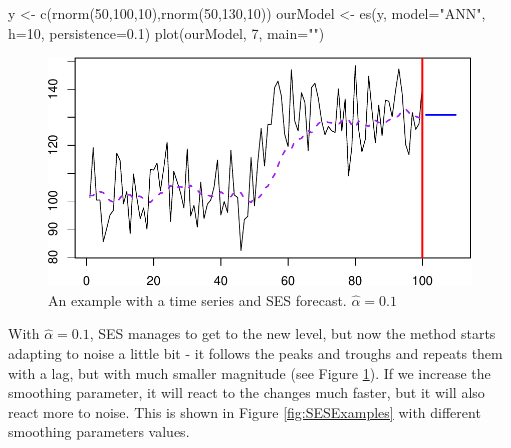 \documentclass[
]{book}
\newenvironment{Shaded}{\begin{snugshade}}{\end{snugshade}}
\newcommand{\AttributeTok}[1]{\textcolor[rgb]{0.77,0.63,0.00}{#1}}
\newcommand{\DecValTok}[1]{\textcolor[rgb]{0.00,0.00,0.81}{#1}}
\newcommand{\FloatTok}[1]{\textcolor[rgb]{0.00,0.00,0.81}{#1}}
\newcommand{\FunctionTok}[1]{\textcolor[rgb]{0.00,0.00,0.00}{#1}}
\newcommand{\NormalTok}[1]{#1}
\newcommand{\OtherTok}[1]{\textcolor[rgb]{0.56,0.35,0.01}{#1}}
\newcommand{\StringTok}[1]{\textcolor[rgb]{0.31,0.60,0.02}{#1}}
\theoremstyle{definition}
\theoremstyle{definition}
\theoremstyle{definition}
\theoremstyle{definition}
\theoremstyle{remark}
\begin{document}
\begin{Shaded}
\begin{Highlighting}[]
\NormalTok{y }\OtherTok{\textless{}{-}} \FunctionTok{c}\NormalTok{(}\FunctionTok{rnorm}\NormalTok{(}\DecValTok{50}\NormalTok{,}\DecValTok{100}\NormalTok{,}\DecValTok{10}\NormalTok{),}\FunctionTok{rnorm}\NormalTok{(}\DecValTok{50}\NormalTok{,}\DecValTok{130}\NormalTok{,}\DecValTok{10}\NormalTok{))}
\NormalTok{ourModel }\OtherTok{\textless{}{-}} \FunctionTok{es}\NormalTok{(y, }\AttributeTok{model=}\StringTok{"ANN"}\NormalTok{, }\AttributeTok{h=}\DecValTok{10}\NormalTok{, }\AttributeTok{persistence=}\FloatTok{0.1}\NormalTok{)}
\FunctionTok{plot}\NormalTok{(ourModel, }\DecValTok{7}\NormalTok{, }\AttributeTok{main=}\StringTok{""}\NormalTok{)}
\end{Highlighting}
\end{Shaded}

\begin{figure}
\centering
\includegraphics{adam_files/figure-latex/SESExample2-1.pdf}
\caption{\label{fig:SESExample2}An example with a time series and SES forecast. \(\hat{\alpha}=0.1\)}
\end{figure}

With \(\hat{\alpha}=0.1\), SES manages to get to the new level, but now the method starts adapting to noise a little bit - it follows the peaks and troughs and repeats them with a lag, but with much smaller magnitude (see Figure \ref{fig:SESExample2}). If we increase the smoothing parameter, it will react to the changes much faster, but it will also react more to noise. This is shown in Figure \ref{fig:SESExamples} with different smoothing parameters values.
\end{document}
